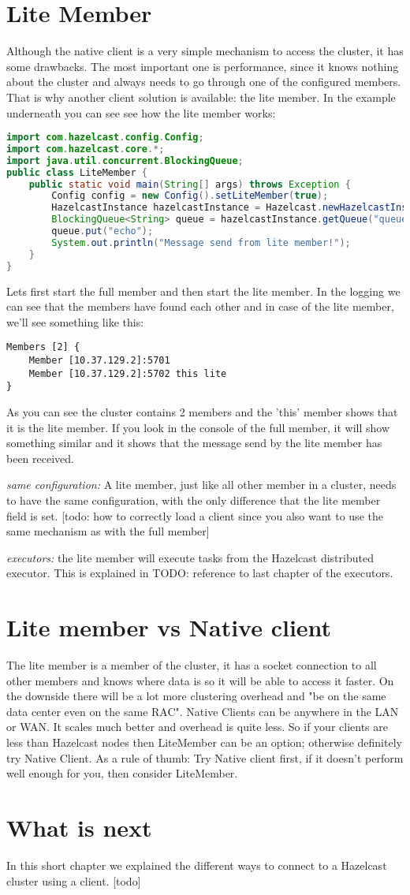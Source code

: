 \section{Lite Member}
Although the native client is a very simple mechanism to access the cluster, it has some drawbacks. The most important one is performance, since it knows nothing about the cluster and always needs to go through one of the configured members. That is why another client solution is available: the lite member. In the example underneath you can see see how the lite member works:
\begin{lstlisting}[language=java]
import com.hazelcast.config.Config;
import com.hazelcast.core.*;
import java.util.concurrent.BlockingQueue;
public class LiteMember {
    public static void main(String[] args) throws Exception {
        Config config = new Config().setLiteMember(true);
        HazelcastInstance hazelcastInstance = Hazelcast.newHazelcastInstance(config);
        BlockingQueue<String> queue = hazelcastInstance.getQueue("queue");
        queue.put("echo");
        System.out.println("Message send from lite member!");
    }
}
\end{lstlisting}
Lets first start the full member and then start the lite member. In the logging we can see that the members have found each other and in case of the lite member, we'll see something like this:
\begin{verbatim}
Members [2] {
    Member [10.37.129.2]:5701
    Member [10.37.129.2]:5702 this lite
}	
\end{verbatim}	
As you can see the cluster contains 2 members and the 'this' member shows that it is the lite member. If you look in the console of the full member, it will show something similar and it shows that the message send by the lite member has been received.

\emph{same configuration:} A lite member, just like all other member in a cluster, needs to have the same configuration, with the only difference that the lite member field is set. [todo: how to correctly load a client since you also want to use the same mechanism as with the full member]

\emph{executors:} the lite member will execute tasks from the Hazelcast distributed executor. This is explained in TODO: reference to last chapter of the executors.

\section{Lite member vs Native client}
The lite member is a member of the cluster, it has a socket connection to all other members and knows where data is so it will be able to access it faster. On the downside there will be a lot more clustering overhead and "be on the same data center even on the same RAC". Native Clients can be anywhere in the LAN or WAN. It scales much better and overhead is quite less. So if your clients are less than Hazelcast nodes then LiteMember can be an option; otherwise definitely try Native Client. As a rule of thumb: Try Native client first, if it doesn't perform well enough for you, then consider LiteMember.

\section{What is next}
In this short chapter we explained the different ways to connect to a Hazelcast cluster using a client. [todo]